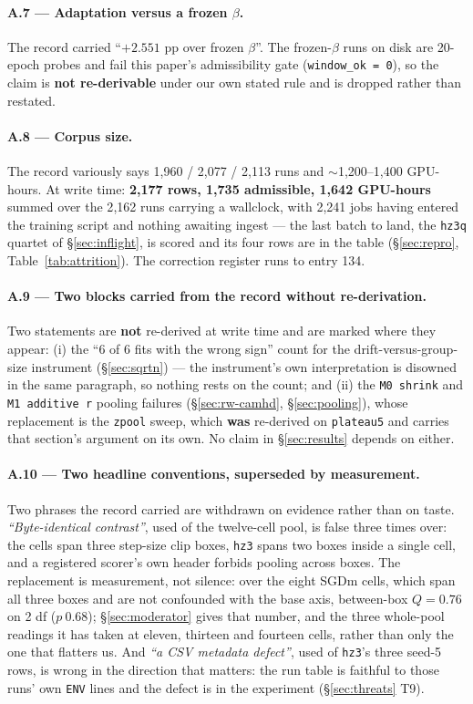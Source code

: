 \documentclass[10pt,letterpaper]{article}
\newcommand{\plateau}{\texttt{plateau5}}
\newcommand{\arm}[1]{\texttt{#1}}
\begin{document}
\paragraph{A.7 --- Adaptation versus a frozen $\beta$.}
The record carried ``$+2.551$ pp over frozen $\beta$''. The frozen-$\beta$ runs on disk are 20-epoch
probes and fail this paper's admissibility gate (\texttt{window\_ok = 0}), so the claim is
\textbf{not re-derivable} under our own stated rule and is dropped rather than restated.

\paragraph{A.8 --- Corpus size.}
The record variously says 1{,}960 / 2{,}077 / 2{,}113 runs and $\sim$1{,}200--1{,}400 GPU-hours. At
write time: \textbf{2{,}177 rows, 1{,}735 admissible, 1{,}642 GPU-hours} summed over the 2{,}162 runs
carrying a wallclock, with 2{,}241 jobs having entered the training script and nothing awaiting
ingest --- the last batch to land, the \arm{hz3q} quartet of \S\ref{sec:inflight}, is scored and its
four rows are in the table (\S\ref{sec:repro}, Table~\ref{tab:attrition}). The correction register
runs to entry 134.

\paragraph{A.9 --- Two blocks carried from the record without re-derivation.}
Two statements are \textbf{not} re-derived at write time and are marked where they appear: (i) the
``6 of 6 fits with the wrong sign'' count for the drift-versus-group-size instrument
(\S\ref{sec:sqrtn}) --- the instrument's own interpretation is disowned in the same paragraph, so
nothing rests on the count; and (ii) the \texttt{M0 shrink} and \texttt{M1 additive r} pooling
failures (\S\ref{sec:rw-camhd}, \S\ref{sec:pooling}), whose replacement is the \arm{zpool} sweep,
which \textbf{was} re-derived on \plateau{} and carries that section's argument on its own. No claim
in \S\ref{sec:results} depends on either.

\paragraph{A.10 --- Two headline conventions, superseded by measurement.}
Two phrases the record carried are withdrawn on evidence rather than on taste. \emph{``Byte-identical
contrast''}, used of the twelve-cell pool, is false three times over: the cells span three step-size
clip boxes, \arm{hz3} spans two boxes inside a single cell, and a registered scorer's own header
forbids pooling across boxes. The replacement is measurement, not silence: over the eight SGDm
cells, which span all three boxes and are not confounded with the base axis, between-box
$Q = 0.76$ on 2 df ($p\ 0.68$); \S\ref{sec:moderator} gives that number, and the three whole-pool
readings it has taken at eleven, thirteen and fourteen cells, rather than only the one that
flatters us. And \emph{``a CSV metadata defect''}, used of \arm{hz3}'s three seed-5 rows,
is wrong in the direction that matters: the run table is faithful to those runs' own \texttt{ENV}
lines and the defect is in the experiment (\S\ref{sec:threats} T9).
\end{document}
